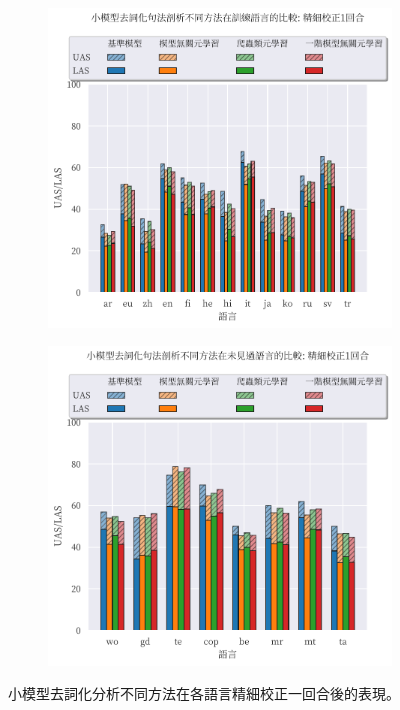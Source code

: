 \begin{figure}[!htbp]
    \centering
    \begin{subfigure}[t]{0.75\textwidth}
        \centering
        \includegraphics[width=\textwidth]{figs/chapter3/delex/bar_small_full_epoch_1_train_langs.pdf}
    \end{subfigure}
    \vspace{-12pt}
    \begin{subfigure}[t]{0.75\textwidth}
        \centering
        \includegraphics[width=\textwidth]{figs/chapter3/delex/bar_small_full_epoch_1_test_langs.pdf}
    \end{subfigure}
    \caption{小模型去詞化分析不同方法在各語言精細校正一回合後的表現。}
    \label{fig:bar_small_full_epoch_1}
\end{figure}
